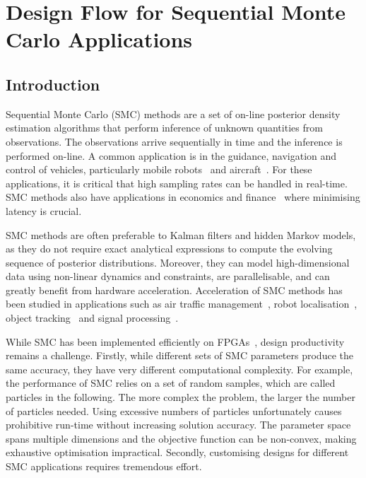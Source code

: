 
\chapter[Design Flow for SMC Applications]{Design Flow for Sequential Monte Carlo Applications}

\section{Introduction}
\label{sec:intro}

Sequential Monte Carlo (SMC) methods are a set of on-line posterior density estimation algorithms that perform inference of unknown quantities from observations.
The observations arrive sequentially in time and the inference is performed on-line.
A common application is in the guidance, navigation and control of vehicles, particularly mobile robots~\cite{montemerlo02} and aircraft~\cite{kantas09}.
For these applications, it is critical that high sampling rates can be handled in real-time.
SMC methods also have applications in economics and finance~\cite{creal12} where minimising latency is crucial.
 
SMC methods are often preferable to Kalman filters and hidden Markov models, as they do not require exact analytical expressions to compute the evolving sequence of posterior distributions.
Moreover, they can model high-dimensional data using non-linear dynamics and constraints, are parallelisable, and can greatly benefit from hardware acceleration.
Acceleration of SMC methods has been studied in applications such as air traffic management~\cite{chau13b,eele13}, robot localisation~\cite{chau13a}, object tracking~\cite{happe13} and signal processing~\cite{hendeby07}.

While SMC has been implemented efficiently on FPGAs~\cite{chau13a,chau13b,happe13,hendeby07}, design productivity remains a challenge.
Firstly, while different sets of SMC parameters produce the same accuracy, they have very different computational complexity.
For example, the performance of SMC relies on a set of random samples, which are called particles in the following.
The more complex the problem, the larger the number of particles needed.
Using excessive numbers of particles unfortunately causes prohibitive run-time without increasing solution accuracy.
The parameter space spans multiple dimensions and the objective function can be non-convex, making exhaustive optimisation impractical.
Secondly, customising designs for different SMC applications requires tremendous effort.

